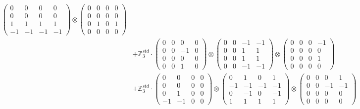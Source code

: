 \documentclass{article}
\begin{document}
{\begin{align}
            \begin{pmatrix} 0 & 0 & 0 & 0 \\ 0 & 0 & 0 & 0 \\ 1 & 1 & 1 & 1 \\ -1 & -1 & -1 & -1 \end{pmatrix} \otimes 
            \begin{pmatrix} 0 & 0 & 0 & 0 \\ 0 & 0 & 0 & 0 \\ 0 & 1 & 0 & 1 \\ 0 & 0 & 0 & 0 \end{pmatrix} \\ 
        &+ \label{Rs16-Rc11-Strassen-1-c20} \mathbb{Z}_3^{std} \cdot 
            \begin{pmatrix} 0 & 0 & 0 & 0 \\ 0 & 0 & -1 & 0 \\ 0 & 0 & 0 & 0 \\ 0 & 0 & 1 & 0 \end{pmatrix} \otimes 
            \begin{pmatrix} 0 & 0 & -1 & -1 \\ 0 & 0 & 1 & 1 \\ 0 & 0 & 1 & 1 \\ 0 & 0 & -1 & -1 \end{pmatrix} \otimes 
            \begin{pmatrix} 0 & 0 & 0 & -1 \\ 0 & 0 & 0 & 0 \\ 0 & 0 & 0 & 1 \\ 0 & 0 & 0 & 0 \end{pmatrix} \\ 
        &+ \label{Rs16-Rc11-Strassen-1-c21} \mathbb{Z}_3^{std} \cdot 
            \begin{pmatrix} 0 & 0 & 0 & 0 \\ 0 & 0 & 0 & 0 \\ 0 & 1 & 0 & 0 \\ -1 & -1 & 0 & 0 \end{pmatrix} \otimes 
            \begin{pmatrix} 0 & 1 & 0 & 1 \\ -1 & -1 & -1 & -1 \\ 0 & -1 & 0 & -1 \\ 1 & 1 & 1 & 1 \end{pmatrix} \otimes 
            \begin{pmatrix} 0 & 0 & 0 & 1 \\ 0 & 0 & -1 & -1 \\ 0 & 0 & 0 & 0 \\ 0 & 0 & 0 & 0 \end{pmatrix} \\ 

\end{align}}
\end{document}
